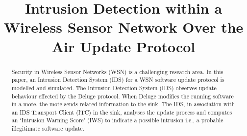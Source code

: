 \documentclass[conference]{IEEEtran}
\begin{document}
\title{Intrusion Detection within a Wireless Sensor Network Over the Air Update Protocol}
\author{
}


\maketitle


\begin{abstract}
Security in Wireless Sensor Networks (WSN) is a challenging research area.
In this paper, an Intrusion Detection System (IDS) for a WSN software update protocol is modelled and simulated. 
The Intrusion Detection System (IDS) observes update behaviour effected by the Deluge protocol.
When Deluge modifies the running software in a mote, the mote sends related information to the sink. 
The IDS, in association with an IDS Transport Client (ITC) in the sink, analyses the update process and computes an `Intrusion Warning Score' (IWS) to indicate a possible intrusion i.e., a probable illegitimate software update.
\end{abstract}


%
\end{document}
